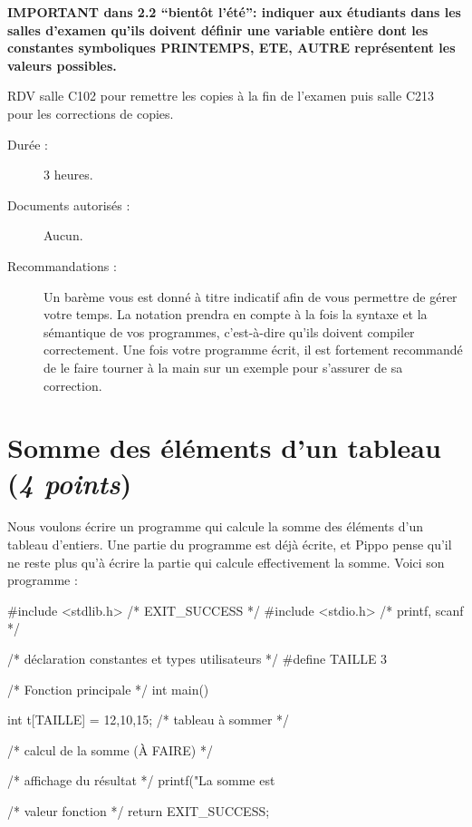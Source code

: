 
\newcommand{\commentaire}[1]{}



\begin{correction}
  \textbf{IMPORTANT dans 2.2 ``bientôt l'été'': indiquer aux étudiants
    dans les salles d'examen qu'ils doivent définir une variable
    entière  dont les constantes symboliques PRINTEMPS, ETE,
    AUTRE représentent les valeurs possibles.}

RDV salle C102 pour remettre les copies à la fin de l'examen puis
salle C213 pour les corrections de copies.

\end{correction}
\begin{description}
\item[Durée :] 3 heures.
\item[Documents autorisés :] Aucun.
\item[Recommandations :] Un barème vous est donné à
titre indicatif afin de vous permettre de gérer votre temps. La
notation prendra en compte à la fois la syntaxe et la sémantique de
vos programmes, c'est-à-dire qu'ils doivent compiler correctement. Une
fois votre programme écrit, il est fortement recommandé de le faire tourner à la
main sur un exemple pour s'assurer de sa correction.
\end{description}

\section{Somme des éléments d'un tableau (\textit{4 points})}

Nous voulons écrire un programme qui calcule la somme des éléments
d'un tableau d'entiers. Une partie du programme est déjà écrite, et
Pippo pense qu'il ne
reste plus qu'à écrire la partie qui calcule effectivement la
somme. Voici son programme :
\begin{listing}{1}
#include <stdlib.h> /* EXIT_SUCCESS */
#include <stdio.h> /* printf, scanf */

/* déclaration constantes et types utilisateurs */
#define TAILLE 3

/* Fonction principale */
int main()
{
  int t[TAILLE] = {12,10,15}; /* tableau à sommer */



  /* calcul de la somme (À FAIRE) */





  /* affichage du résultat */
  printf("La somme est %

  /* valeur fonction */
  return EXIT_SUCCESS;
}
\end{listing}

